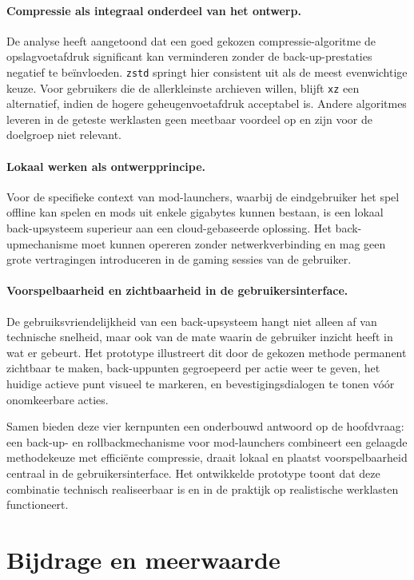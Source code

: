 \paragraph{Compressie als integraal onderdeel van het ontwerp.}
De analyse heeft aangetoond dat een goed gekozen compressie-algoritme de opslagvoetafdruk significant kan verminderen zonder de back-up-prestaties negatief te beïnvloeden. \texttt{zstd} springt hier consistent uit als de meest evenwichtige keuze. Voor gebruikers die de allerkleinste archieven willen, blijft \texttt{xz} een alternatief, indien de hogere geheugenvoetafdruk acceptabel is. Andere algoritmes leveren in de geteste werklasten geen meetbaar voordeel op en zijn voor de doelgroep niet relevant.

\paragraph{Lokaal werken als ontwerpprincipe.}
Voor de specifieke context van mod-launchers, waarbij de eindgebruiker het spel offline kan spelen en mods uit enkele gigabytes kunnen bestaan, is een lokaal back-upsysteem superieur aan een cloud-gebaseerde oplossing. Het back-upmechanisme moet kunnen opereren zonder netwerkverbinding en mag geen grote vertragingen introduceren in de gaming sessies van de gebruiker.

\paragraph{Voorspelbaarheid en zichtbaarheid in de gebruikersinterface.}
De gebruiksvriendelijkheid van een back-upsysteem hangt niet alleen af van technische snelheid, maar ook van de mate waarin de gebruiker inzicht heeft in wat er gebeurt. Het prototype illustreert dit door de gekozen methode permanent zichtbaar te maken, back-uppunten gegroepeerd per actie weer te geven, het huidige actieve punt visueel te markeren, en bevestigingsdialogen te tonen vóór onomkeerbare acties.

Samen bieden deze vier kernpunten een onderbouwd antwoord op de hoofdvraag: een back-up- en rollbackmechanisme voor mod-launchers combineert een gelaagde methodekeuze met efficiënte compressie, draait lokaal en plaatst voorspelbaarheid centraal in de gebruikersinterface. Het ontwikkelde prototype toont dat deze combinatie technisch realiseerbaar is en in de praktijk op realistische werklasten functioneert.


\section{Bijdrage en meerwaarde}
\label{sec:concl-bijdrage}

